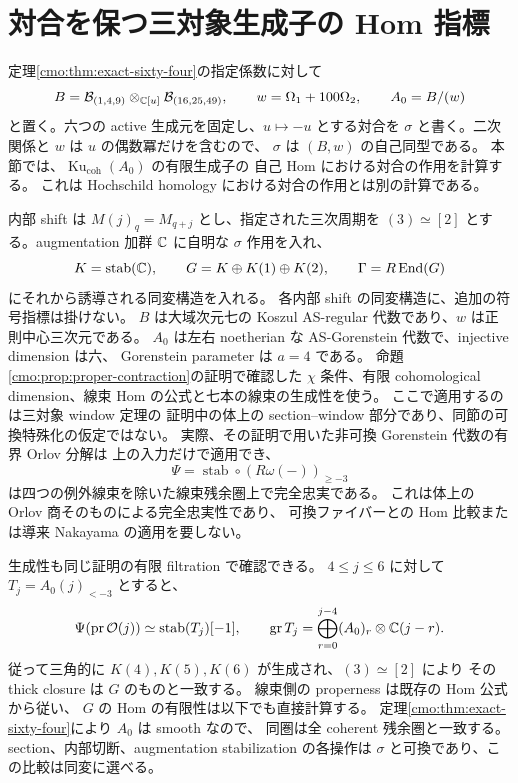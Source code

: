 \section{対合を保つ三対象生成子の Hom 指標}
\label{mix:sec:equivariant-window}

定理\ref{cmo:thm:exact-sixty-four}の指定係数に対して
\[
 B=\mathcal B_{(1,4,9)}\otimes_{\mathbb C[u]}\mathcal B_{(16,25,49)},
 \qquad w=\Omega_1+100\Omega_2,\qquad A_0=B/(w)
\]
と置く。六つの active 生成元を固定し、$u\mapsto-u$ とする対合を
$\sigma$ と書く。二次関係と $w$ は $u$ の偶数冪だけを含むので、
$\sigma$ は $(B,w)$ の自己同型である。
本節では、$\operatorname{Ku}_{\mathrm{coh}}(A_0)$ の有限生成子の
自己 Hom における対合の作用を計算する。
これは Hochschild homology における対合の作用とは別の計算である。

内部 shift は $M(j)_q=M_{q+j}$ とし、指定された三次周期を
$(3)\simeq[2]$ とする。augmentation 加群 $\mathbb C$ に自明な
$\sigma$ 作用を入れ、
\[
 K=\operatorname{stab}(\mathbb C),\qquad
 G=K\oplus K(1)\oplus K(2),\qquad
 \Gamma=R\operatorname{End}(G)
\]
にそれから誘導される同変構造を入れる。
各内部 shift の同変構造に、追加の符号指標は掛けない。
$B$ は大域次元七の Koszul AS-regular 代数であり、$w$ は正則中心三次元である。
$A_0$ は左右 noetherian な AS-Gorenstein 代数で、injective dimension は六、
Gorenstein parameter は $a=4$ である。
命題\ref{cmo:prop:proper-contraction}の証明で確認した
$\chi$ 条件、有限 cohomological dimension、線束 Hom の公式と七本の線束の生成性を使う。
ここで適用するのは三対象 window 定理の
証明中の体上の section--window 部分であり、同節の可換特殊化の仮定ではない。
実際、その証明で用いた非可換 Gorenstein 代数の有界 Orlov 分解は
上の入力だけで適用でき、
\[
 \Psi=\operatorname{stab}\circ(R\omega(-))_{\ge-3}
\]
は四つの例外線束を除いた線束残余圏上で完全忠実である。
これは体上の Orlov 商そのものによる完全忠実性であり、
可換ファイバーとの Hom 比較または導来 Nakayama の適用を要しない。

生成性も同じ証明の有限 filtration で確認できる。
$4\le j\le6$ に対して $T_j=A_0(j)_{<-3}$ とすると、
\[
 \Psi(\operatorname{pr}\mathcal O(j))\simeq\operatorname{stab}(T_j)[-1],
 \qquad
 \operatorname{gr}T_j=\bigoplus_{r=0}^{j-4}(A_0)_r\otimes\mathbb C(j-r).
\]
従って三角的に $K(4),K(5),K(6)$ が生成され、$(3)\simeq[2]$ により
その thick closure は $G$ のものと一致する。
線束側の properness は既存の Hom 公式から従い、
$G$ の Hom の有限性は以下でも直接計算する。
定理\ref{cmo:thm:exact-sixty-four}により $A_0$ は smooth なので、
同圏は全 coherent 残余圏と一致する。
section、内部切断、augmentation stabilization の各操作は
$\sigma$ と可換であり、この比較は同変に選べる。

